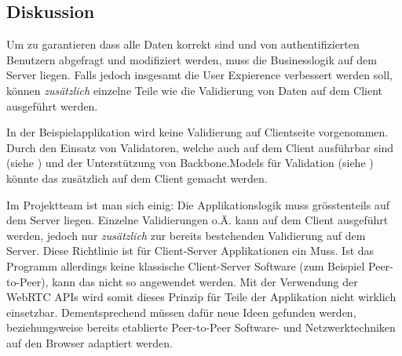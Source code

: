 \subsection*{Diskussion}
Um zu garantieren dass alle Daten korrekt sind und von authentifizierten Benutzern abgefragt und modifiziert werden, muss die Businesslogik auf dem Server liegen.
Falls jedoch insgesamt die User Expierence verbessert werden soll, können \emph{zusätzlich} einzelne Teile wie die Validierung von Daten auf dem Client ausgeführt werden.

In der Beispielapplikation wird keine Validierung auf Clientseite vorgenommen. Durch den Einsatz von Validatoren, welche auch auf dem Client ausführbar sind (siehe \cite{nodevalidator}) und der Unterstützung von Backbone.Models für Validation (siehe \cite{BackboneModelValidation}) könnte das zusätzlich auf dem Client gemacht werden.

Im Projektteam ist man sich einig: Die Applikationslogik muss grösstenteils auf dem Server liegen. Einzelne Validierungen o.Ä. kann auf dem Client ausgeführt werden, jedoch nur \emph{zusätzlich} zur bereits bestehenden Validierung auf dem Server.
Diese Richtlinie ist für Client-Server Applikationen ein Muss. Ist das Programm allerdings keine klassische Client-Server Software (zum Beispiel Peer-to-Peer), kann das nicht so angewendet werden.
Mit der Verwendung der \gls{WebRTC} APIs \cite{WebRTC} wird somit dieses Prinzip für Teile der Applikation nicht wirklich einsetzbar. Dementsprechend müssen dafür neue Ideen gefunden werden, beziehungsweise bereits etablierte Peer-to-Peer Software- und Netzwerktechniken auf den Browser adaptiert werden.